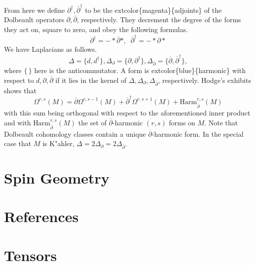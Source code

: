 \documentclass[
]{book}
\begin{document}
From here we define \(\partial^\dagger, \overline{\partial}^{\dagger}\) to be the extcolor\{magenta\}\{adjoints\} of the Dolbeault operators \(\partial, \overline{\partial}\), respectively.
They decrement the degree of the forms they act on, square to zero, and obey the following formulas.
\begin{equation}
    \partial^\dagger = - \ast \overline{\partial} \ast, \;\; \overline{\partial}^\dagger = - \ast \partial \ast 
\end{equation}
We have Laplacians as follows.
\begin{equation} 
    \Delta = \{d, d^\dagger\}, \Delta_\partial = \{\partial, \partial^\dagger\}, \Delta_{\overline{\partial}} = \{\overline{\partial}, \overline{\partial}^\dagger\},  
\end{equation}
where \(\{ \, \}\) here is the anticommutator.
A form is extcolor\{blue\}\{harmonic\} with respect to \(d, \partial, \overline{\partial}\) if it lies in the kernel of \(\Delta, \Delta_\partial, \Delta_{\overline{\partial}}\), respectively.
Hodge's exhibits shows that
\begin{equation} 
    \Omega^{r,s}(M) = \overline{\partial} \Omega^{r,s-1}(M) + \overline{\partial}^\dagger         \Omega^{r,s+1}(M) + \text{Harm}_{\overline{\partial}}^{r,s}(M) 
\end{equation}
with this sum being orthogonal with respect to the aforementioned inner product and with \(\text{Harm}_{\overline{\partial}}^{r,s}(M)\) the set of \(\overline{\partial}\)-harmonic \((r,s)\) forms on \(M\).
Note that Dolbeault cohomology classes contain a unique \(\overline{\partial}\)-harmonic form.
In the special case that \(M\) is K"ahler, \(\Delta = 2\Delta_\partial = 2\Delta_{\overline{\partial}}\).

\hypertarget{spin-geometry}{%
\chapter{Spin Geometry}\label{spin-geometry}}

\hypertarget{references}{%
\chapter*{References}\label{references}}

\cleardoublepage

\hypertarget{appendix-appendix}{%
\appendix}


\hypertarget{tensors}{%
\chapter{Tensors}\label{tensors}}
\end{document}
